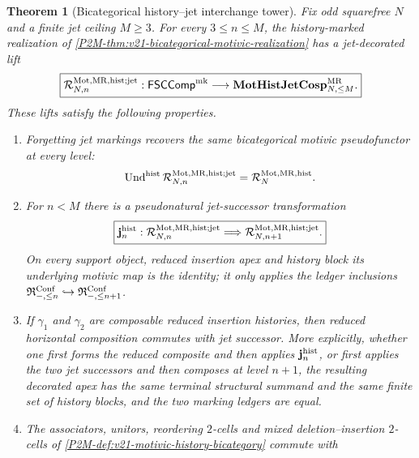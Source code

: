 \documentclass[11pt]{article}
\newtheorem{theorem}{Theorem}[section]
\theoremstyle{remark}
\newcommand{\Mot}{\mathrm{Mot}}
\newcommand{\MR}{\mathrm{MR}}
\providecommand{\FSCComp}{\mathsf{FSCComp}}
\begin{document}
\begin{theorem}[Bicategorical history--jet interchange tower]
\label{P2M-thm:v35-history-jet-pseudonatural-tower}
Fix odd squarefree $N$ and a finite jet ceiling $M\ge3$.  For every
$3\le n\le M$, the history-marked realization of
\cref{P2M-thm:v21-bicategorical-motivic-realization} has a jet-decorated lift
\begin{equation}
 \boxed{
 \mathcal R^{\Mot,\MR,\mathrm{hist};\mathrm{jet}}_{N,n}:
 \FSCComp^{\rm mk}
 \longrightarrow
 \mathbf{MotHistJetCosp}^{\MR}_{N,\le M}.}
 \label{P2M-eq:v35-history-jet-pseudofunctor}
\end{equation}
These lifts satisfy the following properties.
\begin{enumerate}[label=\textup{(\roman*)}]
\item Forgetting jet markings recovers the same bicategorical motivic
      pseudofunctor at every level:
      \[
       \operatorname{Und}^{\rm hist}
       \mathcal R^{\Mot,\MR,\mathrm{hist};\mathrm{jet}}_{N,n}
       =
       \mathcal R_N^{\Mot,\MR,\mathrm{hist}}.
      \]
\item For $n<M$ there is a pseudonatural jet-successor transformation
      \begin{equation}
       \boxed{
       \mathbf j_n^{\rm hist}:
       \mathcal R^{\Mot,\MR,\mathrm{hist};\mathrm{jet}}_{N,n}
       \Longrightarrow
       \mathcal R^{\Mot,\MR,\mathrm{hist};\mathrm{jet}}_{N,n+1}.}
       \label{P2M-eq:v35-history-jet-successor}
      \end{equation}
      On every support object, reduced insertion apex and history block its
      underlying motivic map is the identity; it only applies the ledger
      inclusions
      $\mathfrak R^{\rm Conf}_{-,\le n}\hookrightarrow
       \mathfrak R^{\rm Conf}_{-,\le n+1}$.
\item If $\gamma_1$ and $\gamma_2$ are composable reduced insertion histories,
      then reduced horizontal composition commutes with jet successor.  More
      explicitly, whether one first forms the reduced composite and then
      applies $\mathbf j_n^{\rm hist}$, or first applies the two jet successors
      and then composes at level $n+1$, the resulting decorated apex has the
      same terminal structural summand and the same finite set of history
      blocks, and the two marking ledgers are equal.
\item The associators, unitors, reordering $2$-cells and mixed
      deletion--insertion $2$-cells of
      \cref{P2M-def:v21-motivic-history-bicategory} commute with

\end{enumerate}
\end{theorem}
\end{document}
